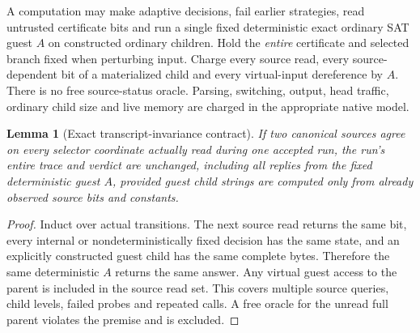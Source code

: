 \documentclass[11pt]{article}
\newtheorem{lemma}[theorem]{Lemma}
\begin{document}
A computation may make adaptive decisions, fail earlier
strategies, read untrusted certificate bits and run a single
fixed deterministic exact ordinary SAT guest $A$ on constructed
ordinary children. Hold the \emph{entire} certificate and
selected branch fixed when perturbing input. Charge every
source read, every source-dependent bit of a materialized
child and every virtual-input dereference by $A$.
There is no free source-status oracle. Parsing, switching,
output, head traffic, ordinary child size and live memory
are charged in the appropriate native model.

\begin{lemma}[Exact transcript-invariance contract]\label{l:trace}
If two canonical sources agree on every selector coordinate
actually read during one accepted run, the run's entire trace
and verdict are unchanged, including all replies from
the fixed deterministic guest $A$, provided guest child strings
are computed only from already observed source bits and constants.
\end{lemma}
\begin{proof}
Induct over actual transitions. The next source read returns
the same bit, every internal or nondeterministically fixed
decision has the same state, and an explicitly constructed
guest child has the same complete bytes. Therefore the same
deterministic $A$ returns the same answer. Any virtual guest
access to the parent is included in the source read set.
This covers multiple source queries, child levels, failed
probes and repeated calls. A free oracle for the
unread full parent violates the premise and is excluded.
\end{proof}
\end{document}
